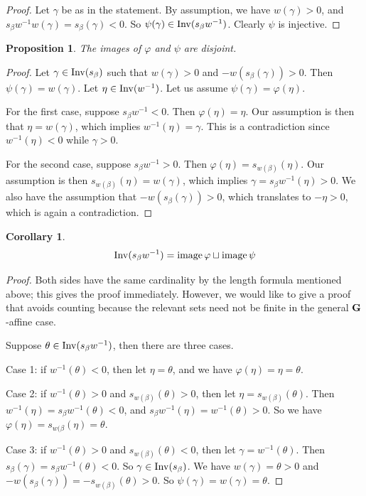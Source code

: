 \documentclass[10pt]{amsart}
\newtheorem{prop}[theo]{Proposition}
\newtheorem{coro}[theo]{Corollary}
\begin{document}
\begin{proof}
Let $\gamma$ be as in the statement. By assumption, we have $w(\gamma) > 0$, and $s_\beta w^{-1} w (\gamma) = s_\beta(\gamma) < 0$. So $\psi(\gamma) \in \operatorname{Inv}(s_\beta w^{-1})$. Clearly $\psi$ is injective.
\end{proof}

\begin{prop}\label{prop-phi-psi-disjoint}
The images of $\varphi$ and $\psi$ are disjoint.
\end{prop}

\begin{proof}
Let $\gamma \in \operatorname{Inv}(s_\beta)$ such that $w(\gamma) > 0$ and $- w(s_\beta(\gamma)) >0 $. Then $\psi(\gamma) = w(\gamma)$. Let $\eta \in \operatorname{Inv}(w^{-1})$. Let us assume $\psi(\gamma) = \varphi(\eta)$.

For the first case, suppose $s_\beta w^{-1} < 0 $. Then $\varphi(\eta) = \eta$. Our assumption is then that $\eta = w(\gamma)$, which implies $w^{-1}(\eta) = \gamma$. This is a contradiction since $w^{-1}(\eta) < 0$ while $\gamma > 0$.

For the second case, suppose $s_\beta w^{-1} > 0$. Then $\varphi(\eta) = s_{w(\beta)}(\eta)$. Our assumption is then $s_{w(\beta)}(\eta) = w(\gamma)$, which implies $\gamma = s_{\beta} w^{-1} (\eta) > 0$. We also have the assumption that $- w (s_{\beta}(\gamma)) > 0$, which translates to $-\eta > 0$, which is again a contradiction.
\end{proof}

\begin{coro}\label{cor-phi-psi-cover-everything}
\begin{equation}\label{eq:17}
\Inv(s_\beta w^{-1}) = \im \varphi \sqcup \im \psi
\end{equation}
\end{coro}

\begin{proof}
Both sides have the same cardinality by the length formula mentioned above; this gives the proof immediately. However, we would like to give a proof that avoids counting because the relevant sets need not be finite in the general $\mathbf{G}$-affine case.

Suppose $\theta \in \operatorname{Inv}(s_\beta w^{-1})$, then there are three cases.

\noindent Case 1: if $w^{-1}(\theta) < 0$, then let $\eta = \theta$, and we have $\varphi(\eta) = \eta = \theta$.

\noindent Case 2: if $w^{-1}(\theta) > 0$ and $ s_{w(\beta)}(\theta) > 0$, then let $\eta = s_{w(\beta)}(\theta)$. Then $w^{-1}(\eta) = s_\beta w^{-1}(\theta) < 0$, and $s_\beta w^{-1} (\eta) = w^{-1}(\theta) > 0$. So we have $\varphi(\eta) = s_{w(\beta} (\eta) = \theta$.

\noindent Case 3: if $w^{-1}(\theta) > 0$ and $ s_{w(\beta)}(\theta) < 0$, then let $\gamma = w^{-1}(\theta)$. Then $s_\beta (\gamma) = s_\beta w^{-1}(\theta) < 0$. So $\gamma \in \operatorname{Inv}(s_\beta)$. We have $w(\gamma) = \theta > 0$ and $- w(s_\beta(\gamma)) = - s_{w(\beta)}(\theta) > 0$. So $\psi(\gamma) = w(\gamma) = \theta$.
\end{proof}
\end{document}
